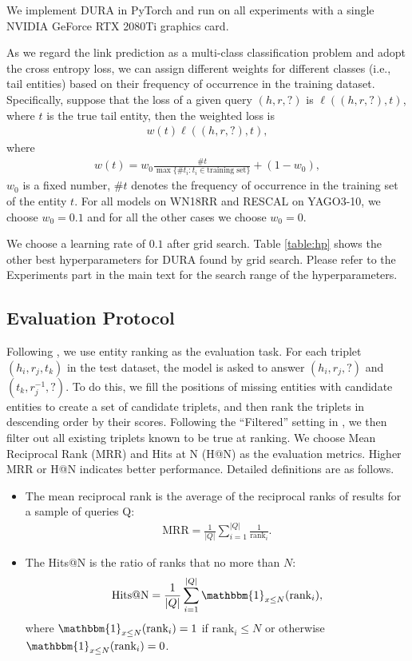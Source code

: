 \documentclass{article}
\begin{document}
We implement DURA in PyTorch and run on all experiments with a single NVIDIA GeForce RTX 2080Ti graphics card.

As we regard the link prediction as a multi-class classification problem and adopt the cross entropy loss, we can assign different weights for different classes (i.e., tail entities) based on their frequency of occurrence in the training dataset. Specifically, suppose that the loss of a given query $(h,r,?)$ is $\ell((h,r,?),t)$, where $t$ is the true tail entity, then the weighted loss is 
\begin{align*}
    w(t)\ell((h,r,?),t),
\end{align*}
where 
\begin{align*}
    w(t)=w_0\frac{\#t}{\max\{\#t_i:t_i \in \text{training set}\}} + (1-w_0),
\end{align*}
$w_0$ is a fixed number, $\#t$ denotes the frequency of occurrence in the training set of the entity $t$. For all models on WN18RR and RESCAL on YAGO3-10, we choose $w_0=0.1$ and for all the other cases we choose $w_0=0$.

We choose a learning rate of $0.1$ after grid search. Table \ref{table:hp} shows the other best hyperparameters for DURA found by grid search. Please refer to the Experiments part in the main text for the search range of the hyperparameters.

\subsection{Evaluation Protocol} 
Following \citet{transe}, we use entity ranking as the evaluation task. For each triplet $(h_i,r_j,t_k)$ in the test dataset, the model is asked to answer $(h_i, r_j, ?)$ and $(t_k, r_j^{-1}, ?)$. To do this, we fill the positions of missing entities with candidate entities to create a set of candidate triplets, and then rank the triplets in descending order by their scores. Following the ``Filtered'' setting in \citet{transe}, we then filter out all existing triplets known to be true at ranking. We choose Mean Reciprocal Rank (MRR) and Hits at N (H@N) as the evaluation metrics. Higher MRR or H@N indicates better performance. Detailed definitions are as follows.
\begin{itemize}[itemindent=-1em]
    \item The mean reciprocal rank is the average of the reciprocal ranks of results for a sample of queries Q:
    \begin{align*}
        \text{MRR}=\frac{1}{|Q|}\sum_{i=1}^{|Q|}\frac{1}{\text{rank}_i}.
    \end{align*}
    \item The Hits@N is the ratio of ranks that no more than $N$:
    \begin{align*}
        \text{Hits@N}=\frac{1}{|Q|}\sum_{i=1}^{|Q|}\mathbbm{1}_{x\le N}(\text{rank}_i),
    \end{align*}
    where $\mathbbm{1}_{x\le N}(\text{rank}_i)=1$ if $\text{rank}_i\le N$ or otherwise $\mathbbm{1}_{x\le N}(\text{rank}_i)=0$.
\end{itemize}
\end{document}
